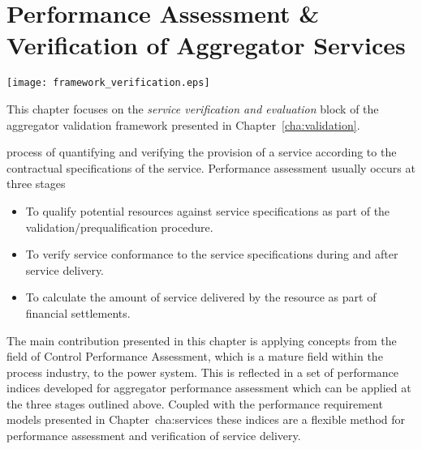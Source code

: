 \chapter{Performance Assessment \& Verification of Aggregator Services} %
\label{cha:verification}
\begin{marginfigure}
	\texttt{[image: framework\_verification.eps]}
	\caption{This chapter focuses on the \emph{service verification and evaluation} block of the aggregator validation framework presented in Chapter~\ref{cha:validation}.}
      \label{fig:frameworkverification}
\end{marginfigure}
 process of quantifying and verifying the provision of a service according to the contractual specifications of the service. Performance assessment usually occurs at three stages
\begin{itemize}
	\item To qualify potential resources against service specifications as part of the validation/prequalification procedure.
	\item To verify service conformance to the service specifications during and after service delivery. 
	\item To calculate the amount of service delivered by the resource as part of financial settlements.
\end{itemize}

The main contribution presented in this chapter is applying concepts from the field of Control Performance Assessment, which is a mature field within the process industry, to the power system. This is reflected in a set of performance indices developed for aggregator performance assessment which can be applied at the three stages outlined above. Coupled with the performance requirement models presented in Chapter~{cha:services} these indices are a flexible method for performance assessment and verification of service delivery.%

